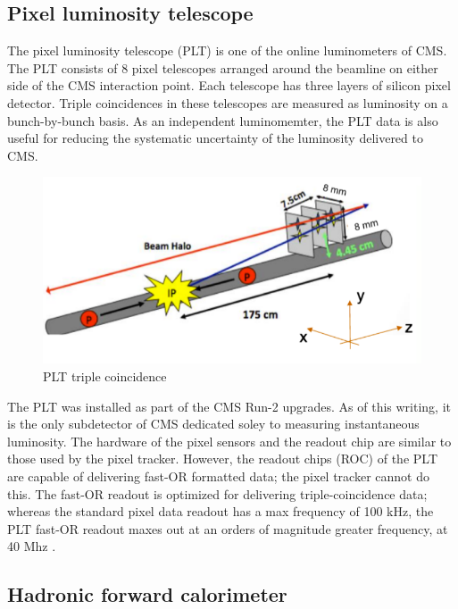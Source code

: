\subsection{Pixel luminosity telescope}

The pixel luminosity telescope (PLT) is one of the online luminometers of CMS. The PLT consists of 8 pixel telescopes arranged around the beamline on either side of the CMS interaction point. Each telescope has three layers of silicon pixel detector. Triple coincidences in these telescopes are measured as luminosity on a bunch-by-bunch basis. As an independent luminomemter, the PLT data is also useful for reducing the systematic uncertainty of the luminosity delivered to CMS. 

\begin{figure}[]
\begin{centering}
\includegraphics[width=5in]{Chapter4/importfigs/plt_triple.png}
\par\end{centering}
\caption{PLT triple coincidence \label{fig:pltTriple}}
\end{figure}

The PLT was installed as part of the CMS Run-2 upgrades. As of this writing, it is the only subdetector of CMS dedicated soley to measuring instantaneous luminosity. The hardware of the pixel sensors and the readout chip are similar to those used by the pixel tracker. However, the readout chips (ROC) of the PLT are capable of delivering fast-OR formatted data; the pixel tracker cannot do this. The fast-OR readout is optimized for delivering triple-coincidence data; whereas the standard pixel data readout has a max frequency of 100 kHz, the PLT fast-OR readout maxes out at an orders of magnitude greater frequency, at 40 Mhz \cite{Kornmayer:2016wkz}.

\subsection{Hadronic forward calorimeter}

